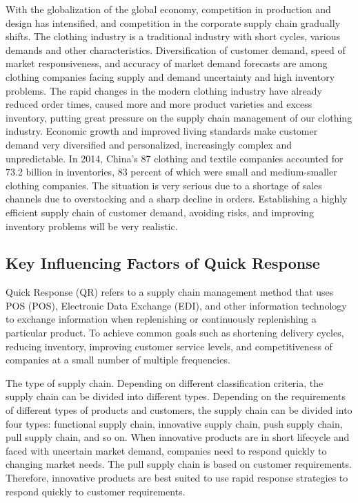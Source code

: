 \documentclass[]{article}
\begin{document}
With the globalization of the global economy, competition in production
and design has intensified, and competition in the corporate supply
chain gradually shifts. The clothing industry is a traditional industry
with short cycles, various demands and other characteristics.
Diversification of customer demand, speed of market responsiveness, and
accuracy of market demand forecasts are among clothing companies facing
supply and demand uncertainty and high inventory problems. The rapid
changes in the modern clothing industry have already reduced order
times, caused more and more product varieties and excess inventory,
putting great pressure on the supply chain management of our clothing
industry. Economic growth and improved living standards make customer
demand very diversified and personalized, increasingly complex and
unpredictable. In 2014, China's 87 clothing and textile companies
accounted for 73.2 billion in inventories, 83 percent of which were
small and medium-smaller clothing companies. The situation is very
serious due to a shortage of sales channels due to overstocking and a
sharp decline in orders. Establishing a highly efficient supply chain of
customer demand, avoiding risks, and improving inventory problems will
be very realistic.

\hypertarget{key-influencing-factors-of-quick-response}{%
\subsection{Key Influencing Factors of Quick
Response}\label{key-influencing-factors-of-quick-response}}

Quick Response (QR) refers to a supply chain management method that uses
POS (POS), Electronic Data Exchange (EDI), and other information
technology to exchange information when replenishing or continuously
replenishing a particular product. To achieve common goals such as
shortening delivery cycles, reducing inventory, improving customer
service levels, and competitiveness of companies at a small number of
multiple frequencies.

The type of supply chain. Depending on different classification
criteria, the supply chain can be divided into different types.
Depending on the requirements of different types of products and
customers, the supply chain can be divided into four types: functional
supply chain, innovative supply chain, push supply chain, pull supply
chain, and so on. When innovative products are in short lifecycle and
faced with uncertain market demand, companies need to respond quickly to
changing market needs. The pull supply chain is based on customer
requirements. Therefore, innovative products are best suited to use
rapid response strategies to respond quickly to customer requirements.
\end{document}

